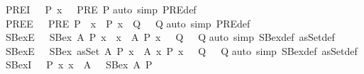 \begin{isabellebody}
\ PRE{\isacharunderscore}I\ {\isacharcolon}\ {\isachardoublequoteopen}{\isasymlbrakk}\ P\ x\ {\isasymrbrakk}\ {\isasymLongrightarrow}\ PRE\ P{\isachardoublequoteclose}\isanewline
%
\isadelimproof
%
\endisadelimproof
%
\isatagproof
{}\isamarkupfalse%
{\isacharparenleft}auto\ simp{\isacharcolon}\ PRE{\isacharunderscore}def{\isacharparenright}%
\endisatagproof
{\isafoldproof}%
%
\isadelimproof
\isanewline
%
\endisadelimproof
\isanewline
{}\isamarkupfalse%
\ PRE{\isacharunderscore}E\ {\isacharcolon}\ {\isachardoublequoteopen}{\isasymlbrakk}\ PRE\ P{\isacharsemicolon}\ {\isasymAnd}\ x{\isachardot}\ \ P\ x\ {\isasymLongrightarrow}\ Q\ {\isasymrbrakk}\ {\isasymLongrightarrow}\ Q{\isachardoublequoteclose}\isanewline
%
\isadelimproof
%
\endisadelimproof
%
\isatagproof
{}\isamarkupfalse%
{\isacharparenleft}auto\ simp{\isacharcolon}\ PRE{\isacharunderscore}def{\isacharparenright}%
\endisatagproof
{\isafoldproof}%
%
\isadelimproof
\isanewline
%
\endisadelimproof
\isanewline
\isanewline
{}\isamarkupfalse%
\ SBex{\isacharunderscore}E{}\ {\isacharcolon}\ {\isachardoublequoteopen}{\isasymlbrakk}\ SBex\ A\ P{\isacharsemicolon}\ {\isasymAnd}x{\isachardot}\ {\isasymlbrakk}\ x\ {\isacharcolon}\ A{\isacharsemicolon}\ P\ x\ {\isasymrbrakk}\ {\isasymLongrightarrow}\ Q\ {\isasymrbrakk}\ {\isasymLongrightarrow}\ Q{\isachardoublequoteclose}\isanewline
%
\isadelimproof
%
\endisadelimproof
%
\isatagproof
{}\isamarkupfalse%
{\isacharparenleft}auto\ simp{\isacharcolon}\ SBex{\isacharunderscore}def\ asSet{\isacharunderscore}def{\isacharparenright}%
\endisatagproof
{\isafoldproof}%
%
\isadelimproof
\isanewline
%
\endisadelimproof
\isanewline
{}\isamarkupfalse%
\ SBex{\isacharunderscore}E{}\ {\isacharcolon}\ {\isachardoublequoteopen}{\isasymlbrakk}\ SBex\ {\isacharparenleft}asSet\ A{\isacharparenright}\ P{\isacharsemicolon}\ {\isasymAnd}x{\isachardot}\ {\isasymlbrakk}\ A\ x{\isacharsemicolon}\ P\ x\ {\isasymrbrakk}\ {\isasymLongrightarrow}\ Q\ {\isasymrbrakk}\ {\isasymLongrightarrow}\ Q{\isachardoublequoteclose}\isanewline
%
\isadelimproof
%
\endisadelimproof
%
\isatagproof
{}\isamarkupfalse%
{\isacharparenleft}auto\ simp{\isacharcolon}\ SBex{\isacharunderscore}def\ asSet{\isacharunderscore}def{\isacharparenright}%
\endisatagproof
{\isafoldproof}%
%
\isadelimproof
\isanewline
%
\endisadelimproof
\isanewline
\isanewline
{}\isamarkupfalse%
\ SBex{\isacharunderscore}I{}\ {\isacharcolon}\ {\isachardoublequoteopen}{\isasymlbrakk}\ P\ x{\isacharsemicolon}\ x\ {\isacharcolon}\ A\ {\isasymrbrakk}\ {\isasymLongrightarrow}\ SBex\ A\ P{\isachardoublequoteclose}\isanewline

\end{isabellebody}
